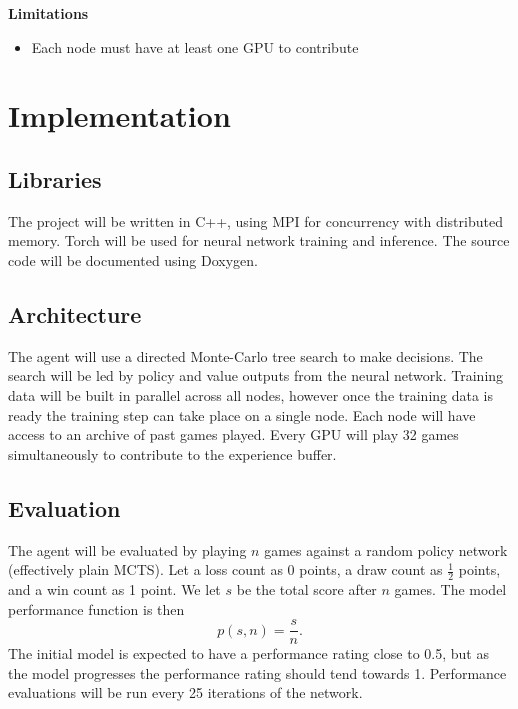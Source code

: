 \documentclass{article}
\begin{document}
\vspace{0.5cm}

\noindent\textbf{Limitations}
\begin{itemize}
    \item Each node must have at least one GPU to contribute
\end{itemize}

\section{Implementation}

\subsection{Libraries}

The project will be written in C++, using MPI for concurrency with distributed memory. Torch will be used for neural network training and inference. The source code will be documented using Doxygen.

\subsection{Architecture}

The agent will use a directed Monte-Carlo tree search to make decisions. The search will be led by policy and value outputs from the neural network. Training data will be built in parallel across all nodes, however once the training data is ready the training step can take place on a single node.
Each node will have access to an archive of past games played. Every GPU will play 32 games simultaneously to contribute to the experience buffer.

\subsection{Evaluation}

The agent will be evaluated by playing $n$ games against a random policy network (effectively plain MCTS). Let a loss count as 0 points, a draw count as $\tfrac{1}{2}$ points, and a win count as 1 point. We let $s$ be the total score after $n$ games. The model performance function is then
$$p(s, n) = \dfrac{s}{n}.$$
The initial model is expected to have a performance rating close to 0.5, but as the model progresses the performance rating should tend towards 1. Performance evaluations will be run every 25 iterations of the network.
\end{document}
